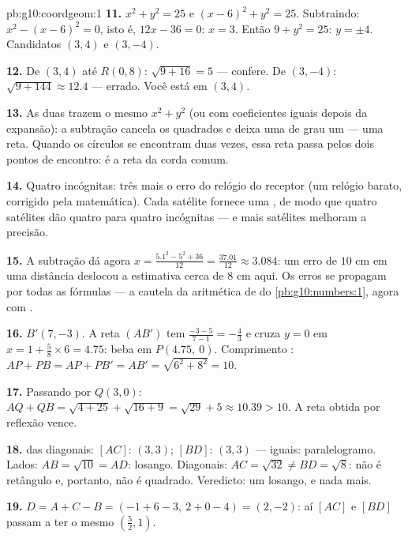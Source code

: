 \begin{solution}{pb:g10:coordgeom:1}
\textbf{11.} $x^2 + y^2 = 25$ e $(x - 6)^2 + y^2 = 25$.
Subtraindo: $x^2 - (x - 6)^2 = 0$, isto é, $12x - 36 = 0$:
$x = 3$. Então $9 + y^2 = 25$: $y = \pm 4$. Candidatos
$(3, 4)$ e $(3, -4)$.

\textbf{12.} De $(3, 4)$ até $R(0, 8)$: $\sqrt{9 + 16} = 5$ ---
confere. De $(3, -4)$: $\sqrt{9 + 144} \approx 12.4$ ---
errado. Você está em $(3, 4)$.

\textbf{13.} As duas  trazem o mesmo $x^2 + y^2$ (ou
com coeficientes iguais depois da expansão): a subtração
cancela os quadrados e deixa uma  de grau um --- uma
reta. Quando os círculos se encontram duas vezes, essa reta
passa pelos dois pontos de encontro: é a reta da corda comum.

\textbf{14.} Quatro incógnitas: três  mais o erro do
relógio do receptor (um relógio barato, corrigido pela
matemática). Cada satélite fornece uma , de modo que
quatro satélites dão quatro  para quatro incógnitas ---
e mais satélites melhoram a precisão.

\textbf{15.} A subtração dá agora
$x = \frac{5.1^2 - 5^2 + 36}{12} = \frac{37.01}{12} \approx
3.084$: um erro de $10$ cm em uma distância deslocou a
estimativa cerca de $8$ cm aqui. Os erros se propagam por
todas as fórmulas --- a cautela da aritmética de  do
\cref{pb:g10:numbers:1}, agora com .

\textbf{16.} $B'(7, -3)$. A reta $(AB')$ tem  $\frac{-3 - 5}{7 - 1} = -\frac43$ e cruza $y = 0$ em
$x = 1 + \frac{5}{8} \times 6 = 4.75$: beba em
$P(4.75,\ 0)$. Comprimento : $AP + PB = AP + PB' = AB' =
\sqrt{6^2 + 8^2} = 10$.

\textbf{17.} Passando por $Q(3, 0)$:
$AQ + QB = \sqrt{4 + 25} + \sqrt{16 + 9} = \sqrt{29} + 5
\approx 10.39 > 10$. A reta obtida por reflexão vence.

\textbf{18.}  das diagonais: $[AC]$: $(3, 3)$;
$[BD]$: $(3, 3)$ --- iguais: paralelogramo. Lados:
$AB = \sqrt{10} = AD$: losango. Diagonais:
$AC = \sqrt{32} \neq BD = \sqrt{8}$: não é retângulo e,
portanto, não é quadrado. Veredicto: um losango, e nada mais.

\textbf{19.} $D = A + C - B = (-1 + 6 - 3,\ 2 + 0 - 4) =
(2, -2)$: aí $[AC]$ e $[BD]$ passam a ter o mesmo 
$\left(\frac52, 1\right)$.


\end{solution}
